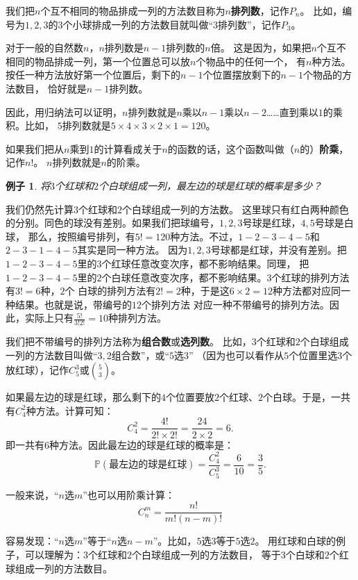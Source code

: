 \documentclass[12pt,UTF8]{ctexbook}
\newtheorem{ex}{例子}[section]
\begin{document}
我们把$n$个互不相同的物品排成一列的方法数目称为$n$\textbf{排列数}，记作$P_n$。
比如，编号为$1,2,3$的$3$个小球排成一列的方法数目就叫做“$3$排列数”，记作$P_3$。

对于一般的自然数$n$，$n$排列数是$n-1$排列数的$n$倍。
这是因为，如果把$n$个互不相同的物品排成一列，第一个位置总可以放$n$个物品中的任何一个，
有$n$种方法。按任一种方法放好第一个位置后，剩下的$n-1$个位置摆放剩下的$n-1$个物品的方法数目，
恰好就是$n-1$排列数。

因此，用归纳法可以证明，$n$排列数就是$n$乘以$n-1$乘以$n-2$……直到乘以$1$的乘积。比如，
$5$排列数就是$5\times 4\times 3\times 2\times 1 = 120$。

如果我们把从$n$乘到$1$的计算看成关于$n$的函数的话，这个函数叫做（$n$的）\textbf{阶乘}，记作$n!$。
$n$排列数就是$n$的阶乘。

\begin{ex}
    将$3$个红球和$2$个白球组成一列，最左边的球是红球的概率是多少？
\end{ex}
我们仍然先计算$3$个红球和$2$个白球组成一列的方法数。
这里球只有红白两种颜色的分别。同色的球没有差别。如果我们把球编号，$1,2,3$号球是红球，$4,5$号球是白球，
那么，按照编号排列，有$5! = 120$种方法。不过，$1-2-3-4-5$和$2-3-1-4-5$其实是同一种方法。
因为$1,2,3$号球都是红球，并没有差别。把$1-2-3-4-5$里的$3$个红球任意改变次序，都不影响结果。同理，
把$1-2-3-4-5$里的$2$个白球任意改变次序，都不影响结果。$3$个红球的排列方法有$3! = 6$种，$2$个
白球的排列方法有$2! = 2$种，于是这$6\times 2 = 12$种方法都对应同一种结果。也就是说，带编号的$12$个排列方法
对应一种不带编号的排列方法。因此，实际上只有$\frac{5!}{3!2!} = 10$种排列方法。

我们把不带编号的排列方法称为\textbf{组合数}或\textbf{选列数}。
比如，$3$个红球和$2$个白球组成一列的方法数目叫做“$3,2$组合数”，或“$5$选$3$”
（因为也可以看作从$5$个位置里选$3$个放红球），记作$C_5^3$或$5 \choose 3$。

如果最左边的球是红球，那么剩下的$4$个位置要放$2$个红球、$2$个白球。于是，一共有$C_4^2$种方法。计算可知：
$$ C_4^2 = \frac{4!}{2!\times 2!} = \frac{24}{2\times 2} = 6.$$
即一共有$6$种方法。因此最左边的球是红球的概率是：
$$ \mathbb{P}(\mbox{最左边的球是红球}) = \frac{C_4^2}{C_5^3} = \frac{6}{10} = \frac{3}{5}.$$

一般来说，“$n$选$m$”也可以用阶乘计算：
$$ C_n^m = \frac{n!}{m!(n-m)!} $$

容易发现：“$n$选$m$”等于“$n$选$n-m$”。比如，$5$选$3$等于$5$选$2$。
用红球和白球的例子，可以理解为：$3$个红球和$2$个白球组成一列的方法数目，
等于$3$个白球和$2$个红球组成一列的方法数目。
\end{document}
